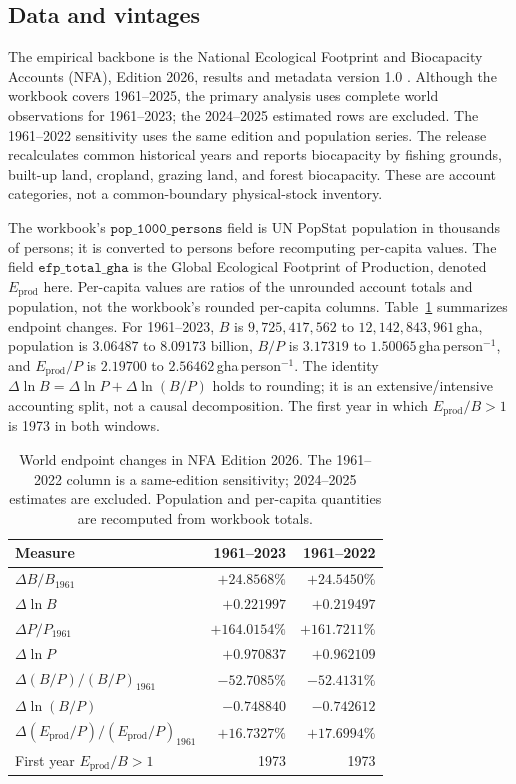 \documentclass[11pt,a4paper]{article}
\begin{document}
\subsection{Data and vintages}\label{si:vintages}

The empirical backbone is the National Ecological Footprint and Biocapacity Accounts (NFA), Edition 2026, results and metadata version 1.0 \citep{Lo2026NFA}. Although the workbook covers 1961--2025, the primary analysis uses complete world observations for 1961--2023; the 2024--2025 estimated rows are excluded. The 1961--2022 sensitivity uses the same edition and population series. The release recalculates common historical years and reports biocapacity by fishing grounds, built-up land, cropland, grazing land, and forest biocapacity. These are account categories, not a common-boundary physical-stock inventory.

The workbook's $\texttt{pop\_1000\_persons}$ field is UN PopStat population in thousands of persons; it is converted to persons before recomputing per-capita values. The field $\texttt{efp\_total\_gha}$ is the Global Ecological Footprint of Production, denoted $E_{\mathrm{prod}}$ here. Per-capita values are ratios of the unrounded account totals and population, not the workbook's rounded per-capita columns. Table~\ref{tab:si_nfa_endpoints} summarizes endpoint changes. For 1961--2023, $B$ is $9{,}725{,}417{,}562$ to $12{,}142{,}843{,}961$\,gha, population is $3.06487$ to $8.09173$ billion, $B/P$ is $3.17319$ to $1.50065$\,gha\,person$^{-1}$, and $E_{\mathrm{prod}}/P$ is $2.19700$ to $2.56462$\,gha\,person$^{-1}$. The identity $\Delta\ln B=\Delta\ln P+\Delta\ln(B/P)$ holds to rounding; it is an extensive/intensive accounting split, not a causal decomposition. The first year in which $E_{\mathrm{prod}}/B>1$ is 1973 in both windows.

\begin{table}[htbp]
\centering\small
\caption{World endpoint changes in NFA Edition 2026. The 1961--2022 column is a same-edition sensitivity; 2024--2025 estimates are excluded. Population and per-capita quantities are recomputed from workbook totals.}
\label{tab:si_nfa_endpoints}
\begin{tabularx}{\textwidth}{>{\raggedright\arraybackslash}Xrr}
\toprule
Measure & 1961--2023 & 1961--2022 \\
\midrule
$\Delta B/B_{1961}$ & $+24.8568\%$ & $+24.5450\%$ \\
$\Delta\ln B$ & $+0.221997$ & $+0.219497$ \\
$\Delta P/P_{1961}$ & $+164.0154\%$ & $+161.7211\%$ \\
$\Delta\ln P$ & $+0.970837$ & $+0.962109$ \\
$\Delta(B/P)/(B/P)_{1961}$ & $-52.7085\%$ & $-52.4131\%$ \\
$\Delta\ln(B/P)$ & $-0.748840$ & $-0.742612$ \\
$\Delta(E_{\mathrm{prod}}/P)/(E_{\mathrm{prod}}/P)_{1961}$ & $+16.7327\%$ & $+17.6994\%$ \\
First year $E_{\mathrm{prod}}/B>1$ & 1973 & 1973 \\
\bottomrule
\end{tabularx}
\end{table}
\end{document}

